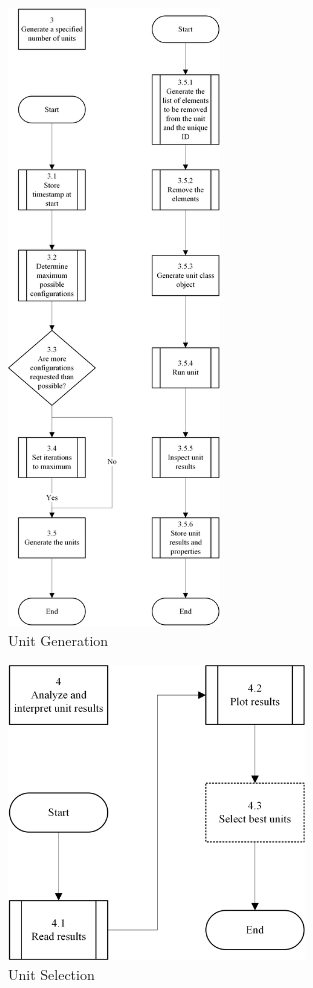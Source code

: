 \begin{figure}[H]
\centering
	\includegraphics[width=0.5\textwidth]{sp3.png}
	\caption{Unit Generation}
	\label{fig:sp3}
\end{figure}

\begin{figure}[H]
\centering
	\includegraphics[width=0.7\textwidth]{sp4.png}
	\caption{Unit Selection}
	\label{fig:sp4}
\end{figure}

\endinput
